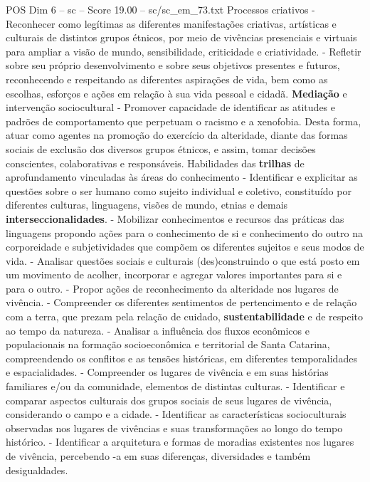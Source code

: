 \begin{textsample}{POS Dim 6 – sc – Score 19.00 – sc/sc\_em\_73.txt}
Processos criativos - Reconhecer como legítimas as diferentes manifestações criativas, artísticas e culturais de distintos grupos étnicos, por meio de vivências presenciais e virtuais para ampliar a visão de mundo, sensibilidade, criticidade e criatividade. - Refletir sobre seu próprio desenvolvimento e sobre seus objetivos presentes e futuros, reconhecendo e respeitando as diferentes aspirações de vida, bem como as escolhas, esforços e ações em relação à sua vida pessoal e cidadã. \textbf{Mediação} e intervenção sociocultural - Promover capacidade de identificar as atitudes e padrões de comportamento que perpetuam o racismo e a xenofobia.
Desta forma, atuar como agentes na promoção do exercício da alteridade, diante das formas sociais de exclusão dos diversos grupos étnicos, e assim, tomar decisões conscientes, colaborativas e responsáveis.
Habilidades das \textbf{trilhas} de aprofundamento vinculadas às áreas do conhecimento - Identificar e explicitar as questões sobre o ser humano como sujeito individual e coletivo, constituído por diferentes culturas, linguagens, visões de mundo, etnias e demais \textbf{interseccionalidades}. - Mobilizar conhecimentos e recursos das práticas das linguagens propondo ações para o conhecimento de si e conhecimento do outro na corporeidade e subjetividades que compõem os diferentes sujeitos e seus modos de vida. - Analisar questões sociais e culturais (des)construindo o que está posto em um movimento de acolher, incorporar e agregar valores importantes para si e para o outro. - Propor ações de reconhecimento da alteridade nos lugares de vivência. - Compreender os diferentes sentimentos de pertencimento e de relação com a terra, que prezam pela relação de cuidado, \textbf{sustentabilidade} e de respeito ao tempo da natureza. - Analisar a influência dos fluxos econômicos e populacionais na formação socioeconômica e territorial de Santa Catarina, compreendendo os conflitos e as tensões históricas, em diferentes temporalidades e espacialidades. - Compreender os lugares de vivência e em suas histórias familiares e/ou da comunidade, elementos de distintas culturas. - Identificar e comparar aspectos culturais dos grupos sociais de seus lugares de vivência, considerando o campo e a cidade. - Identificar as características socioculturais observadas nos lugares de vivências e suas transformações ao longo do tempo histórico. - Identificar a arquitetura e formas de moradias existentes nos lugares de vivência, percebendo -a em suas diferenças, diversidades e também desigualdades.

\end{textsample}
